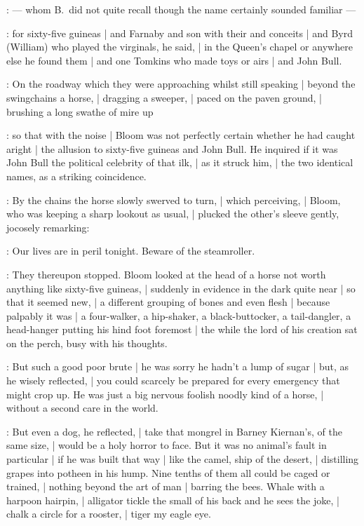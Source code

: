 :
    --- whom B.~did not quite recall though the name certainly sounded familiar ---

:
for sixty-five guineas |
and Farnaby and son with their  and  conceits |
and Byrd (William) who played the virginals, he said, |
in the Queen's chapel or anywhere else he found them |
and one Tomkins who made toys or airs |
and John Bull.

:
On the roadway which they were approaching whilst still speaking |
beyond the swingchains a horse, |
dragging a sweeper, |
paced on the paven ground, |
brushing a long swathe of mire up

:
so that with the noise |
Bloom was not perfectly certain whether he had caught aright |
the allusion to sixty-five guineas and John Bull.
He inquired if it was John Bull the political celebrity of that ilk, |
as it struck him, |
the two identical names, as a striking coincidence.

:
By the chains the horse slowly swerved to turn, |
which perceiving, |
Bloom, who was keeping a sharp lookout as usual, |
plucked the other's sleeve gently, jocosely remarking:

\Bloom:
Our lives are in peril tonight.
Beware of the steamroller.

:
They thereupon stopped.
Bloom looked at the head of a horse not worth anything like sixty-five guineas, |
suddenly in evidence in the dark quite near |
so that it seemed new, |
a different grouping of bones and even flesh |
because palpably it was |
a four-walker, a hip-shaker, a black-buttocker,
a tail-dangler, a head-hanger putting his hind foot foremost |
the while the lord of his creation sat on the perch, busy with his thoughts.

:
But such a good poor brute |
he was sorry he hadn't a lump of sugar |
but, as he wisely reflected, |
you could scarcely be prepared for every emergency that might crop up.
He was just a big nervous foolish noodly kind of a horse, |
without a second care in the world.

:
But even a dog, he reflected, |
take that mongrel in Barney Kiernan's, of the same size, |
would be a holy horror to face.
But it was no animal's fault in particular |
if he was built that way |
like the camel, ship of the desert, |
distilling grapes into potheen in his hump.
Nine tenths of them all could be caged or trained, |
nothing beyond the art of man |
barring the bees.
Whale with a harpoon hairpin, |
alligator tickle the small of his back and he sees the joke, |
chalk a circle for a rooster, |
tiger my eagle eye.

